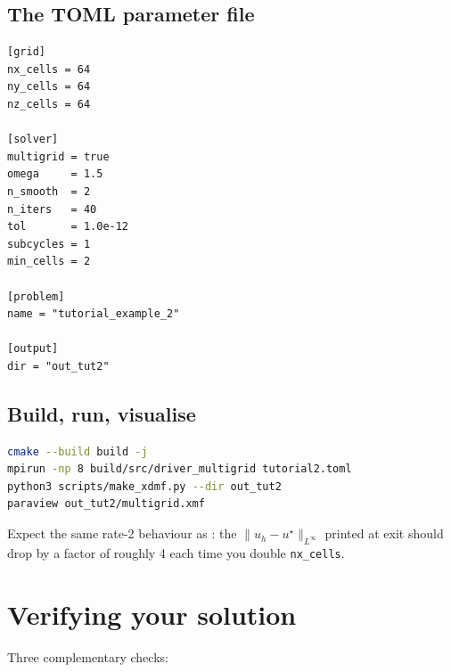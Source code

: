 \documentclass[11pt]{article}
\newcommand{\Linf}{L^{\infty}}
\begin{document}
\subsection{The TOML parameter file}

\begin{lstlisting}[language={},caption={\tt tutorial2.toml}]
[grid]
nx_cells = 64
ny_cells = 64
nz_cells = 64

[solver]
multigrid = true
omega     = 1.5
n_smooth  = 2
n_iters   = 40
tol       = 1.0e-12
subcycles = 1
min_cells = 2

[problem]
name = "tutorial_example_2"

[output]
dir = "out_tut2"
\end{lstlisting}

\subsection{Build, run, visualise}

\begin{lstlisting}[language=bash]
cmake --build build -j
mpirun -np 8 build/src/driver_multigrid tutorial2.toml
python3 scripts/make_xdmf.py --dir out_tut2
paraview out_tut2/multigrid.xmf
\end{lstlisting}
Expect the same rate-2 behaviour as : the
$\|u_h - u^\star\|_{\Linf}$ printed at exit should drop by a factor of
roughly 4 each time you double \texttt{nx\_cells}.

\section{Verifying your solution}\label{sec:verify}

Three complementary checks:
\end{document}
